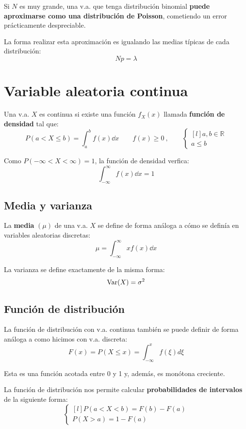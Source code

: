 \documentclass[a4paper]{book}
\begin{document}
\begin{nota}

	Si $N$ es muy grande, una v.a. que tenga distribución binomial \textbf{puede aproximarse como una distribución de Poisson}, cometiendo un error prácticamente despreciable.

	La forma realizar esta aproximación es igualando las medias típicas de cada distribución: \[Np = \lambda\]
\end{nota}

\section{Variable aleatoria continua}
Una v.a. $X$ es continua si existe una función $f_X(x)$ llamada \textbf{función de densidad} tal que: \[\boxed{P\left( a<X\leq b \right) = \int_a^b{f(x)\dd{x}} \qquad  f(x) \geq 0}\: ,\qquad
	\left\{ \begin{matrix*}[l]
		a,b\in \mathbb{R}\\
		a\leq b
	\end{matrix*}\right. \]

\begin{nota}
	Como $P\left( -\infty < X < \infty \right) = 1$, la función de densidad verfica: \[\int_{-\infty}^{\infty}{f(x)\dd{x}} = 1\]
\end{nota}

\subsection{Media y varianza}
La \textbf{media} $(\mu)$ de una v.a. $X$ se define de forma análoga a cómo se definía en variables aleatorias discretas: \[\mu = \int_{-\infty}^{\infty}{x f(x) \dd{x}}\]

La varianza se define exactamente de la misma forma: \[\operatorname{Var}(X) = \sigma ^2\]

\subsection{Función de distribución}
La función de distribución con v.a. continua también se puede definir de forma análoga a como hicimos con v.a. discreta: \[\boxed{F(x) = P\left( X\leq x \right) = \int_{-\infty}^x{f(\xi )d\xi}}\]

Esta es una función acotada entre 0 y 1 y, además, es monótona creciente.

La función de distribución nos permite calcular \textbf{probabilidades de intervalos} de la siguiente forma: \[\left\{ \begin{matrix*}[l]
		P(a<X<b) = F(b) - F(a)\\[5pt]
		P(X>a) = 1 - F(a) \end{matrix*}\right.\]
\end{document}
